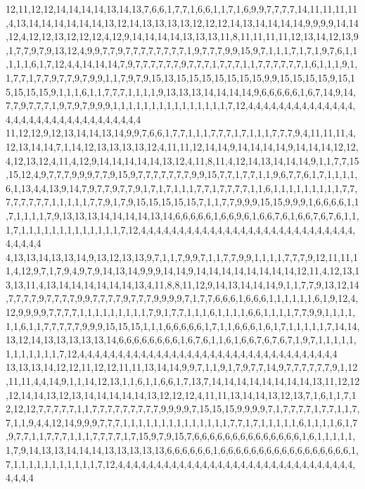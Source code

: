12,11,12,12,14,14,14,14,13,14,13,7,6,6,1,7,7,1,6,6,1,1,7,1,6,9,9,7,7,7,7,14,11,11,11,11,4,13,14,14,14,14,14,14,13,12,14,13,13,13,13,12,12,12,14,13,14,14,14,14,9,9,9,9,14,14,12,4,12,12,13,12,12,12,4,12,9,14,14,14,14,13,13,13,11,8,11,11,11,11,12,13,14,12,13,9,1,7,7,9,7,9,13,12,4,9,9,7,7,9,7,7,7,7,7,7,7,7,1,9,7,7,7,9,9,15,9,7,1,1,1,7,1,7,1,9,7,6,1,1,1,1,1,6,1,7,12,4,4,14,14,14,7,9,7,7,7,7,7,7,9,7,7,7,1,7,7,7,1,1,7,7,7,7,7,7,1,6,1,1,1,9,1,1,7,7,1,7,7,9,7,7,9,7,9,9,1,1,7,9,7,9,15,13,15,15,15,15,15,15,15,9,9,15,15,15,15,9,15,15,15,15,15,9,1,1,1,6,1,1,7,7,7,1,1,1,1,9,13,13,13,14,14,14,14,9,6,6,6,6,6,1,6,7,14,9,14,7,7,9,7,7,7,1,9,7,9,7,9,9,9,1,1,1,1,1,1,1,1,1,1,1,1,1,1,1,7,12,4,4,4,4,4,4,4,4,4,4,4,4,4,4,4,4,4,4,4,4,4,4,4,4,4,4,4,4,4,4,4,4
11,12,12,9,12,13,14,14,13,14,9,9,7,6,6,1,7,7,1,1,1,7,7,7,1,7,1,1,1,7,7,7,9,4,11,11,11,4,12,13,14,14,7,1,14,12,13,13,13,13,12,4,11,11,12,14,14,9,14,14,14,14,9,14,14,14,12,12,4,12,13,12,4,11,4,12,9,14,14,14,14,14,13,12,4,11,8,11,4,12,14,13,14,14,14,9,1,1,7,7,15,15,12,4,9,7,7,7,9,9,9,7,7,9,15,9,7,7,7,7,7,7,7,9,9,15,7,7,1,7,7,1,1,9,6,7,7,6,1,7,1,1,1,1,6,1,13,4,4,13,9,14,7,9,7,7,9,7,7,9,1,7,1,7,1,1,1,7,7,1,7,7,7,7,1,1,6,1,1,1,1,1,1,1,1,1,7,7,7,7,7,7,7,7,1,1,1,1,1,7,7,9,1,7,9,15,15,15,15,15,7,1,1,7,7,9,9,9,15,15,9,9,9,1,6,6,6,6,1,1,7,1,1,1,1,7,9,13,13,13,14,14,14,14,13,14,6,6,6,6,6,1,6,6,9,6,1,6,6,7,6,1,6,6,7,6,7,6,1,1,1,7,1,1,1,1,1,1,1,1,1,1,1,1,1,7,12,4,4,4,4,4,4,4,4,4,4,4,4,4,4,4,4,4,4,4,4,4,4,4,4,4,4,4,4,4,4,4,4,4
4,13,13,14,13,13,14,9,13,12,13,13,9,7,1,1,7,9,9,7,1,1,7,7,9,9,1,1,1,1,7,7,7,9,12,11,11,11,4,12,9,7,1,7,9,4,9,7,9,14,13,14,9,9,9,14,14,9,14,14,14,14,14,14,14,14,12,11,4,12,13,13,13,11,4,13,14,14,14,14,14,14,13,4,11,8,8,11,12,9,14,13,14,14,14,9,1,1,7,7,9,13,12,14,7,7,7,7,9,7,7,7,7,9,9,7,7,7,7,9,7,7,7,9,9,9,9,7,1,7,7,6,6,6,1,6,6,6,1,1,1,1,1,1,6,1,9,12,4,12,9,9,9,9,7,7,7,7,1,1,1,1,1,1,1,1,1,7,9,1,7,7,1,1,1,6,1,1,1,1,6,6,1,1,1,1,7,7,9,9,1,1,1,1,1,1,6,1,1,7,7,7,7,7,9,9,9,15,15,15,1,1,1,6,6,6,6,6,1,7,1,1,6,6,6,1,6,1,7,1,1,1,1,1,7,14,14,13,12,14,13,13,13,13,13,14,6,6,6,6,6,6,6,6,1,6,7,6,1,1,6,1,6,6,7,6,7,6,7,1,9,7,1,1,1,1,1,1,1,1,1,1,1,1,7,12,4,4,4,4,4,4,4,4,4,4,4,4,4,4,4,4,4,4,4,4,4,4,4,4,4,4,4,4,4,4,4,4,4,4
13,13,13,14,12,12,11,12,12,11,11,13,14,14,9,9,7,1,1,9,1,7,9,7,7,14,9,7,7,7,7,7,7,9,1,12,11,11,4,4,14,9,1,1,14,12,13,1,1,6,1,1,6,6,1,7,13,7,14,14,14,14,14,14,14,14,13,11,12,12,12,14,14,13,12,13,14,14,14,14,14,13,12,12,12,4,11,11,13,14,14,13,12,13,7,1,6,1,1,7,12,12,12,7,7,7,7,7,1,1,7,7,7,7,7,7,7,7,7,9,9,9,9,7,15,15,15,9,9,9,9,7,1,7,7,7,7,1,7,7,1,1,7,7,1,1,9,4,4,12,14,9,9,9,7,7,7,1,1,1,1,1,1,1,1,1,1,1,1,1,1,7,7,1,7,1,1,1,1,1,6,1,1,1,1,6,1,7,9,7,7,1,1,7,7,7,1,1,1,7,7,7,7,1,7,15,9,7,9,15,7,6,6,6,6,6,6,6,6,6,6,6,6,6,6,1,6,1,1,1,1,1,1,7,9,14,13,13,14,14,14,13,13,13,13,13,6,6,6,6,6,6,1,6,6,6,6,6,6,6,6,6,6,6,6,6,6,6,6,6,1,7,1,1,1,1,1,1,1,1,1,1,1,7,12,4,4,4,4,4,4,4,4,4,4,4,4,4,4,4,4,4,4,4,4,4,4,4,4,4,4,4,4,4,4,4,4,4,4,4
